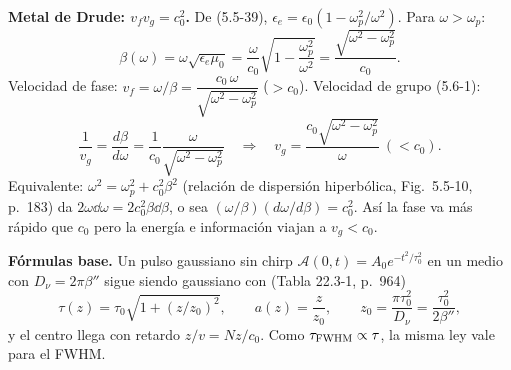  \textbf{Metal de Drude: $v_fv_g=c_0^2$.} De (5.5-39), $\epsilon_e=\epsilon_0(1-\omega_p^2/\omega^2)$. Para
$\omega>\omega_p$:
\[
\beta(\omega)=\omega\sqrt{\epsilon_e\mu_0}=\frac{\omega}{c_0}\sqrt{1-\frac{\omega_p^2}{\omega^2}}=\frac{\sqrt{\omega^2-\omega_p^2}}{c_0}.
\]
Velocidad de fase: $v_f=\omega/\beta=\dfrac{c_0\,\omega}{\sqrt{\omega^2-\omega_p^2}}$ ($>c_0$). Velocidad de grupo (5.6-1):
\[
\frac{1}{v_g}=\frac{d\beta}{d\omega}=\frac{1}{c_0}\frac{\omega}{\sqrt{\omega^2-\omega_p^2}}
\quad\Longrightarrow\quad v_g=\frac{c_0\sqrt{\omega^2-\omega_p^2}}{\omega}\ (<c_0).
\]
Equivalente: $\omega^2=\omega_p^2+c_0^2\beta^2$ (relación de dispersión hiperbólica, Fig.~5.5-10, p.~183) da
$2\omega\dd\omega=2c_0^2\beta\dd\beta$, o sea $(\omega/\beta)(d\omega/d\beta)=c_0^2$. Así la fase va más rápido que
$c_0$ pero la energía e información viajan a $v_g<c_0$.


\label{sol:17}

\textbf{Fórmulas base.} Un pulso gaussiano sin chirp $\mathcal A(0,t)=A_0e^{-t^2/\tau_0^2}$ en un medio con
$D_\nu=2\pi\beta''$ sigue siendo gaussiano con (Tabla 22.3-1, p.~964)
\[
\tau(z)=\tau_0\sqrt{1+(z/z_0)^2},\qquad a(z)=\frac{z}{z_0},\qquad z_0=\frac{\pi\tau_0^2}{D_\nu}=\frac{\tau_0^2}{2\beta''},
\]
y el centro llega con retardo $z/v=Nz/c_0$. Como $\tau_{\rm FWHM}\propto\tau$, la misma ley vale para el FWHM.

